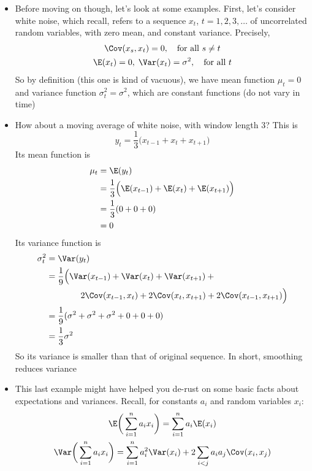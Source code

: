 \documentclass{article}
\begin{document}
\begin{itemize}
  The second of these (joint dependence) we will address soon when we talk about
  auto-covariance and stationarity. The first (mean and variance specifying the 
  distribution) we will revisit later when we talk about Gaussian processes  

\item Before moving on though, let's look at some examples. First, let's
  consider white noise, which recall, refers to a sequence $x_t$, $t =
  1,2,3,\dots$ of uncorrelated random variables, with zero mean, and constant
  variance. Precisely,   
  \begin{gather*}
  \Cov(x_s, x_t) = 0, \quad \text{for all $s \not= t$} \\
  \E(x_t) = 0, \; \Var(x_t) = \sigma^2, \quad \text{for all $t$} 
  \end{gather*}
  So by definition (this one is kind of vacuous), we have mean function $\mu_t =
  0$ and variance function $\sigma^2_t = \sigma^2$, which are constant functions
  (do not vary in time)

\item How about a moving average of white noise, with window length 3? This is 
  \[
  y_t = \frac{1}{3} \Big( x_{t-1} + x_t + x_{t+1} \Big)
  \]
  Its mean function is
  \begin{align*}
  \mu_t &= \E(y_t)  \\
  &= \frac{1}{3} \Big( \E(x_{t-1}) + \E(x_t) + \E(x_{t+1}) \Big) \\ 
  &= \frac{1}{3} ( 0 + 0 + 0 ) \\
  &= 0
  \end{align*}
  Its variance function is
  \begin{align*}
  \sigma^2_t &= \Var(y_t) \\
  &= \frac{1}{9} \Big( \Var(x_{t-1}) + \Var(x_t) + \Var(x_{t+1}) +{} \\
  &\qquad\qquad 2 \Cov(x_{t-1}, x_t) + 2 \Cov(x_t, x_{t+1}) + 2 \Cov(x_{t-1}, 
    x_{t+1}) \Big) \\
  &= \frac{1}{9} ( \sigma^2 + \sigma^2 + \sigma^2 + 0 + 0 + 0) \\
  &= \frac{1}{3} \sigma^2
  \end{align*}
  So its variance is smaller than that of original sequence. In short, smoothing
  reduces variance 

\item This last example might have helped you de-rust on some basic facts about
  expectations and variances. Recall, for constants $a_i$ and random variables
  $x_i$: 
  \begin{gather*}
  \E\bigg( \sum_{i=1}^n a_i x_i \bigg) = \sum_{i=1}^n a_i \E(x_i) \\
  \Var\bigg( \sum_{i=1}^n a_i x_i \bigg) = \sum_{i=1}^n a_i^2 \Var(x_i) + 2
  \sum_{i < j} a_i a_j \Cov(x_i, x_j) 
  \end{gather*}


\end{itemize}
\end{document}
